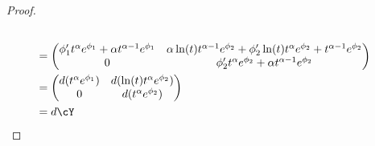 \begin{proof}
\begin{align*}
    \\&=\begin{pmatrix}
      \phi_1' t^\alpha e^{\phi_1} +\alpha t^{\alpha-1} e^{\phi_1}
      &
      \alpha\ln(t)t^{\alpha-1} e^{\phi_2}
      +\phi_2' \ln(t)t^\alpha e^{\phi_2}
      +t^{\alpha-1} e^{\phi_2}
      \\0 & \phi_2' t^\alpha e^{\phi_2}+\alpha t^{\alpha-1} e^{\phi_2}
    \end{pmatrix}
    \\&=\begin{pmatrix}
      d(t^\alpha e^{\phi_1}) & d(\ln(t)t^\alpha e^{\phi_2})
      \\0 & d(t^\alpha e^{\phi_2})
    \end{pmatrix}
    \\&=d\cY
  \end{align*}
\end{proof}
